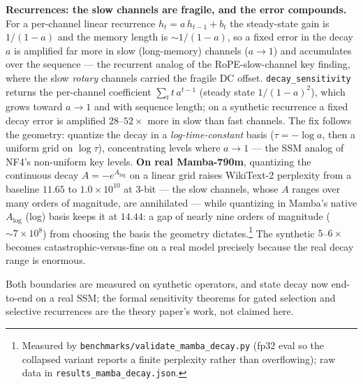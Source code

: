 \documentclass[11pt]{article}
\begin{document}
\textbf{Recurrences: the slow channels are fragile, and the error compounds.}
For a per-channel linear recurrence $h_t = a\,h_{t-1} + b_t$ the steady-state
gain is $1/(1-a)$ and the memory length is ${\sim}1/(1-a)$, so a fixed error in
the decay $a$ is amplified far more in slow (long-memory) channels ($a\to1$) and
accumulates over the sequence --- the recurrent analog of the RoPE-slow-channel
key finding, where the slow \emph{rotary} channels carried the fragile DC
offset. \texttt{decay\_sensitivity} returns the per-channel coefficient
$\sum_t t\,a^{t-1}$ (steady state $1/(1-a)^2$), which grows toward $a\to1$ and
with sequence length; on a synthetic recurrence a fixed decay error is amplified
$28$--$52\times$ more in slow than fast channels. The fix follows the geometry:
quantize the decay in a \emph{log-time-constant} basis ($\tau=-\log a$, then a
uniform grid on $\log\tau$), concentrating levels where $a\to1$ --- the SSM
analog of NF4's non-uniform key levels. \textbf{On real Mamba-790m}, quantizing
the continuous decay $A=-e^{A_{\log}}$ on a linear grid raises WikiText-2
perplexity from a baseline $11.65$ to $1.0\times10^{10}$ at 3-bit --- the slow
channels, whose $A$ ranges over many orders of magnitude, are annihilated ---
while quantizing in Mamba's native $A_{\log}$ (log) basis keeps it at $14.44$: a
gap of nearly nine orders of magnitude ($\sim\!7\times10^{8}$) from choosing the
basis the geometry dictates.\footnote{Measured by
\texttt{benchmarks/validate\_mamba\_decay.py} (fp32 eval so the collapsed variant
reports a finite perplexity rather than overflowing); raw data in
\texttt{results\_mamba\_decay.json}.} The synthetic $5$--$6\times$ becomes
catastrophic-versus-fine on a real model precisely because the real decay range
is enormous.

Both boundaries are measured on synthetic operators, and state decay now
end-to-end on a real SSM; the formal sensitivity theorems for gated selection
and selective recurrences are the theory paper's work, not claimed here.
\end{document}
